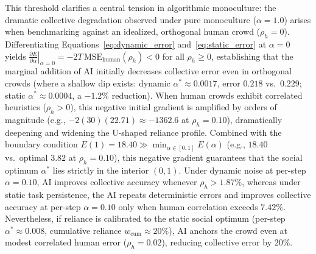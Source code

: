 \documentclass
[letterpaper]{article}
\begin{document}
This threshold clarifies a central tension in algorithmic monoculture: the dramatic collective degradation observed under pure monoculture ($\alpha = 1.0$) arises when benchmarking against an idealized, orthogonal human crowd ($\rho_h = 0$). Differentiating Equations~\ref{eq:dynamic_error} and~\ref{eq:static_error} at $\alpha = 0$ yields $\left.\frac{\partial E}{\partial \alpha}\right|_{\alpha=0} = -2T \, \text{MSE}_{\text{human}}(\rho_h) < 0$ for all $\rho_h \ge 0$, establishing that the marginal addition of AI initially decreases collective error even in orthogonal crowds (where a shallow dip exists: dynamic $\alpha^* \approx 0.0017$, error $0.218$ vs.\ $0.229$; static $\alpha^* \approx 0.0004$, a $-1.2\%$ reduction). When human crowds exhibit correlated heuristics ($\rho_h > 0$), this negative initial gradient is amplified by orders of magnitude (e.g., $-2(30)(22.71) \approx -1362.6$ at $\rho_h = 0.10$), dramatically deepening and widening the U-shaped reliance profile. Combined with the boundary condition $E(1) = 18.40 \gg \min_{\alpha \in [0,1]} E(\alpha)$ (e.g., $18.40$ vs.\ optimal $3.82$ at $\rho_h = 0.10$), this negative gradient guarantees that the social optimum $\alpha^*$ lies strictly in the interior $(0, 1)$. Under dynamic noise at per-step $\alpha = 0.10$, AI improves collective accuracy whenever $\rho_h > 1.87\%$, whereas under static task persistence, the AI repeats deterministic errors and improves collective accuracy at per-step $\alpha = 0.10$ only when human correlation exceeds $7.42\%$. Nevertheless, if reliance is calibrated to the static social optimum (per-step $\alpha^* \approx 0.008$, cumulative reliance $w_{\text{cum}} \approx 20\%$), AI anchors the crowd even at modest correlated human error ($\rho_h = 0.02$), reducing collective error by $20\%$.
\end{document}
